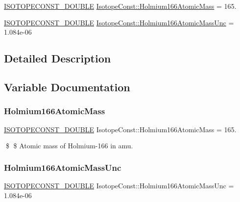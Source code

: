 \begin{DoxyCompactItemize}
\item 
\mbox{\hyperlink{group___isotope_const-_macros_ga8f45a7272ce02c0b4c65c44636ed719a}{I\+S\+O\+T\+O\+P\+E\+C\+O\+N\+S\+T\+\_\+\+D\+O\+U\+B\+LE}} \mbox{\hyperlink{group___isotope_const-_holmium-_ho166_ga2ea54afe7d423e9f8077743066a21466}{Isotope\+Const\+::\+Holmium166\+Atomic\+Mass}} = 165.
\item 
\mbox{\hyperlink{group___isotope_const-_macros_ga8f45a7272ce02c0b4c65c44636ed719a}{I\+S\+O\+T\+O\+P\+E\+C\+O\+N\+S\+T\+\_\+\+D\+O\+U\+B\+LE}} \mbox{\hyperlink{group___isotope_const-_holmium-_ho166_ga88fd43bc36046c82ce4583cdd63a8c3e}{Isotope\+Const\+::\+Holmium166\+Atomic\+Mass\+Unc}} = 1.\+084e-\/06
\end{DoxyCompactItemize}


\subsection{Detailed Description}


\subsection{Variable Documentation}
\mbox{\label{group___isotope_const-_holmium-_ho166_ga2ea54afe7d423e9f8077743066a21466}} 
\subsubsection{\texorpdfstring{Holmium166\+Atomic\+Mass}{Holmium166AtomicMass}}
{\footnotesize\ttfamily \mbox{\hyperlink{group___isotope_const-_macros_ga8f45a7272ce02c0b4c65c44636ed719a}{I\+S\+O\+T\+O\+P\+E\+C\+O\+N\+S\+T\+\_\+\+D\+O\+U\+B\+LE}} Isotope\+Const\+::\+Holmium166\+Atomic\+Mass = 165.}

\$ \$ Atomic mass of Holmium-\/166 in amu. \mbox{\label{group___isotope_const-_holmium-_ho166_ga88fd43bc36046c82ce4583cdd63a8c3e}} 
\subsubsection{\texorpdfstring{Holmium166\+Atomic\+Mass\+Unc}{Holmium166AtomicMassUnc}}
{\footnotesize\ttfamily \mbox{\hyperlink{group___isotope_const-_macros_ga8f45a7272ce02c0b4c65c44636ed719a}{I\+S\+O\+T\+O\+P\+E\+C\+O\+N\+S\+T\+\_\+\+D\+O\+U\+B\+LE}} Isotope\+Const\+::\+Holmium166\+Atomic\+Mass\+Unc = 1.\+084e-\/06}

